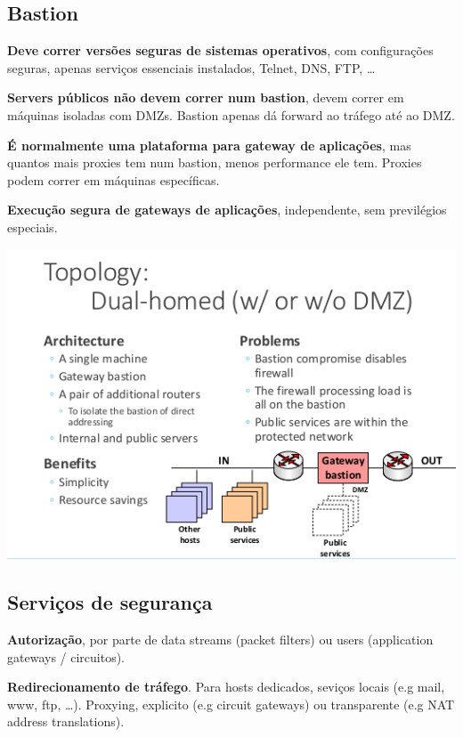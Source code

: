 \documentclass{article}
\begin{document}
\pagebreak

\subsection{Bastion}

\begin{flushleft}
  \textbf{Deve correr versões seguras de sistemas operativos}, com configurações seguras,
  apenas serviços essenciais instalados, Telnet, DNS, FTP, \dots

  \vspace{2mm}

  \textbf{Servers públicos não devem correr num bastion}, devem correr
  em máquinas isoladas com DMZs. Bastion apenas dá forward ao tráfego
  até ao DMZ.

  \vspace{2mm}

  \textbf{É normalmente uma plataforma para gateway de aplicações}, mas quantos mais proxies
  tem num bastion, menos performance ele tem. Proxies podem correr em máquinas
  específicas.

  \vspace{2mm}

  \textbf{Execução segura de gateways de aplicações}, independente, sem previlégios
  especiais.
\end{flushleft}

\begin{center}
  \includegraphics[scale=0.4]{58}
\end{center}

\subsection{Serviços de segurança}

\begin{flushleft}
  \textbf{Autorização}, por parte de data streams (packet filters) ou
  users (application gateways / circuitos).

  \vspace{2mm}

  \textbf{Redirecionamento de tráfego}. Para hosts dedicados, seviços locais
  (e.g mail, www, ftp, \dots). Proxying, explicito (e.g circuit gateways) ou
  transparente (e.g NAT address translations).
\end{flushleft}
\end{document}
